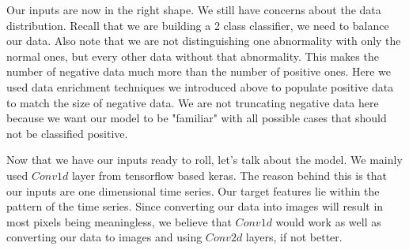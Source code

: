 \documentclass[%
 reprint,
 amsmath,amssymb,
 aps,
]{revtex4-2}
\begin{document}
Our inputs are now in the right shape. We still have concerns about the data distribution. Recall that we are building a 2 class classifier, we need to balance our data. Also note that we are not distinguishing one abnormality with only the normal ones, but every other data without that abnormality. This makes the number of negative data much more than the number of positive ones. Here we used data enrichment techniques we introduced above to populate positive data to match the size of negative data. We are not truncating negative data here because we want our model to be "familiar" with all possible cases that should not be classified positive.

Now that we have our inputs ready to roll, let's talk about the model. We mainly used $Conv1d$ layer from tensorflow based keras. The reason behind this is that our inputs are one dimensional time series. Our target features lie within the pattern of the time series. Since converting our data into images will result in most pixels being meaningless, we believe that $Conv1d$ would work as well as converting our data to images and using $Conv2d$ layers, if not better. 
\end{document}
